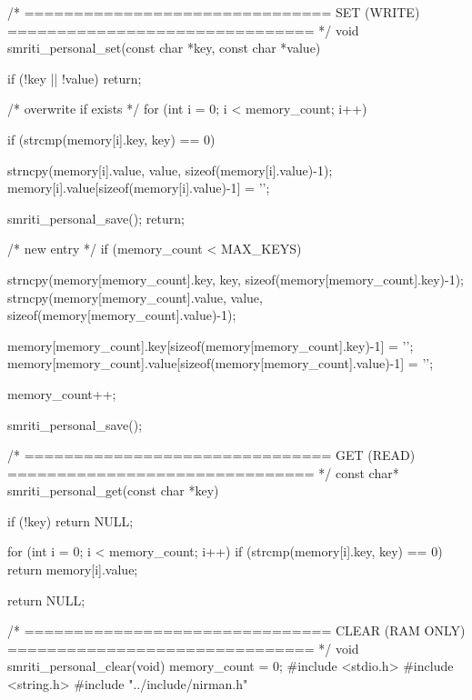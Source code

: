 \documentclass{article}
\begin{document}
/* ===============================
   SET (WRITE)
   =============================== */
void smriti_personal_set(const char *key, const char *value)
{
    if (!key || !value) return;

    /* overwrite if exists */
    for (int i = 0; i < memory_count; i++)
    {
        if (strcmp(memory[i].key, key) == 0)
        {
            strncpy(memory[i].value, value, sizeof(memory[i].value)-1);
            memory[i].value[sizeof(memory[i].value)-1] = '\0';

            smriti_personal_save();
            return;
        }
    }

    /* new entry */
    if (memory_count < MAX_KEYS)
    {
        strncpy(memory[memory_count].key, key, sizeof(memory[memory_count].key)-1);
        strncpy(memory[memory_count].value, value, sizeof(memory[memory_count].value)-1);

        memory[memory_count].key[sizeof(memory[memory_count].key)-1] = '\0';
        memory[memory_count].value[sizeof(memory[memory_count].value)-1] = '\0';

        memory_count++;

        smriti_personal_save();
    }
}

/* ===============================
   GET (READ)
   =============================== */
const char* smriti_personal_get(const char *key)
{
    if (!key) return NULL;

    for (int i = 0; i < memory_count; i++)
    {
        if (strcmp(memory[i].key, key) == 0)
        {
            return memory[i].value;
        }
    }

    return NULL;
}

/* ===============================
   CLEAR (RAM ONLY)
   =============================== */
void smriti_personal_clear(void)
{
    memory_count = 0;
}
#include <stdio.h>
#include <string.h>
#include "../include/nirman.h"
\end{document}
